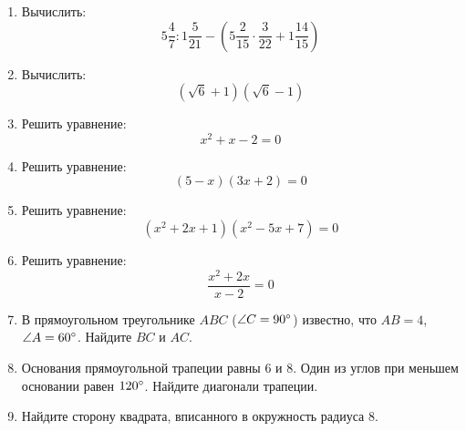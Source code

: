 \documentclass[12pt, a4paper]{article}
\begin{document}
		

\begin{enumerate}
	\item Вычислить: $$5\dfrac{4}{7}:1\dfrac{5}{21}-\left(5\dfrac{2}{15}\cdot\dfrac{3}{22}+1\dfrac{14}{15}\right)$$
	\item Вычислить: $$(\sqrt{6}+1)(\sqrt{6}-1)$$
	\item Решить уравнение:$$x^2+x-2=0$$
	\item Решить уравнение:$$(5-x)(3x+2)=0$$
	\item Решить уравнение:$$(x^2+2x+1)(x^2-5x+7)=0$$
	\item Решить уравнение:$$\dfrac{x^2+2x}{x-2}=0$$
	\item В прямоугольном треугольнике $ABC$ ($\angle C = 90\degree$) известно, что $AB = 4$, $\angle A = 60\degree$. Найдите $BC$ и $AC$.
	\item Основания прямоугольной трапеции равны $6$ и $8$. Один из углов при меньшем основании равен $120\degree$. Найдите диагонали трапеции.
	\item Найдите сторону квадрата, вписанного в окружность радиуса $8$.
	
\end{enumerate}
\end{document}
